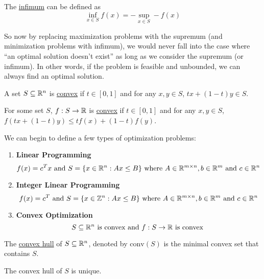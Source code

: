 \documentclass[11pt]{article}
\newcommand{\conv}[1]{\text{conv}(#1)}
\begin{document}
\begin{definition}
    The \underline{infimum} can be defined as
    \begin{equation*}
        \inf_{x \in S} f(x) = - \sup_{x \in S} -f(x)
    \end{equation*}
\end{definition}
So now by replacing maximization problems with the supremum (and minimization
problems with infimum), we would never fall into the case where ``an optimal
solution doesn't exist'' as long as we consider the supremum (or infimum). In
other words, if the problem is feasible and unbounded, we can always find an
optimal solution.

\begin{definition}
	A set $S\subseteq\mathbb{R}^n$ is \underline{convex} if $t\in[0,1]$ and for any $x,y \in
	S$, $tx + (1-t)y \in S$.
\end{definition}
\begin{definition}
	For some set $S$, $f:S \to \mathbb{R}$ is \underline{convex} if $t\in[0,1]$ and for
	any $x,y \in S$, $f(tx + (1-t)y) \leq tf(x) + (1-t)f(y)$.
\end{definition}

We can begin to define a few types of optimization problems:

\begin{enumerate}
    \item {\bf Linear Programming}
        \begin{equation*}
			f(x) = c^Tx \text{ and } S = \{x\in\mathbb{R}^n:Ax\leq B\}
            \text{ where } A \in\mathbb{R}^{m\times n}, b\in\mathbb{R}^m\text{ and } c \in \mathbb{R}^n
        \end{equation*}
	\item {\bf Integer Linear Programming}
		\begin{equation*}
			f(x) = c^T \text{ and } S = \{ x \in \mathbb{Z}^n:Ax\leq B\}
            \text{ where } A \in\mathbb{R}^{m\times n}, b\in\mathbb{R}^m\text{ and } c \in \mathbb{R}^n
		\end{equation*}
	\item {\bf Convex Optimization}
		\begin{equation*}
			S \subseteq \mathbb{R}^n \text{ is convex and } f:S \to \mathbb{R} \text{ is convex
		}
		\end{equation*}
\end{enumerate}
\begin{definition}
	The \underline{convex hull} of $S \subseteq \mathbb{R}^n$, denoted by $\conv{S}$ is
	the minimal convex set that contains $S$.
\end{definition}
\begin{remark}
	The convex hull of $S$ is unique.
\end{remark}
\end{document}
